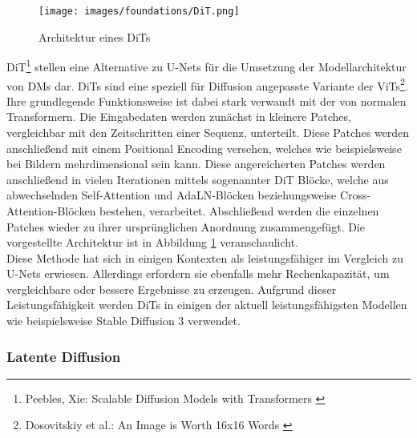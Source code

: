 \begin{figure}[ht]
    \centering
    \texttt{[image: images/foundations/DiT.png]} 
    \caption{Architektur eines \ac{DiT}s \cite{peebles2023scalable}}
    \label{fig:dit}
\end{figure}
\ac{DiT}\footnote{
    Peebles, Xie: Scalable Diffusion Models with Transformers
    \cite{peebles2023scalable}
} stellen eine Alternative zu U-Nets für die Umsetzung der Modellarchitektur von \ac{DM}s dar. \ac{DiT}s sind eine speziell für Diffusion angepasste Variante der \ac{ViT}s\footnote{
    Dosovitskiy et al.: An Image is Worth 16x16 Words 
    \cite{dosovitskiy2021imageworth16x16words}
}.\\
Ihre grundlegende Funktionsweise ist dabei stark verwandt mit der von normalen Transformern. Die Eingabedaten werden zunächst in kleinere Patches, vergleichbar mit den Zeitschritten einer Sequenz, unterteilt. Diese Patches werden anschließend mit einem Positional Encoding versehen, welches wie beispielsweise bei Bildern mehrdimensional sein kann. Diese angereicherten Patches werden anschließend in vielen Iterationen mittels sogenannter \ac{DiT} Blöcke, welche aus abwechselnden Self-Attention und \ac{AdaLN}-Blöcken beziehungsweise Cross-Attention-Blöcken bestehen, verarbeitet. Abschließend werden die einzelnen Patches wieder zu ihrer ursprünglichen Anordnung zusammengefügt. Die vorgestellte Architektur ist in Abbildung \ref{fig:dit} veranschaulicht.\\
Diese Methode hat sich in einigen Kontexten als leistungsfähiger im Vergleich zu U-Nets erwiesen. Allerdings erfordern sie ebenfalls mehr Rechenkapazität, um vergleichbare oder bessere Ergebnisse zu erzeugen. Aufgrund dieser Leistungsfähigkeit werden \ac{DiT}s in einigen der aktuell leistungsfähigsten Modellen wie beispielsweise Stable Diffusion 3 verwendet.

\subsubsection{Latente Diffusion}

